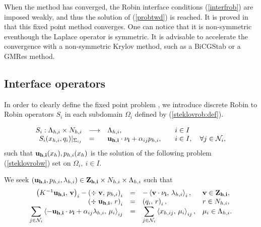 When the method has converged, the Robin interface conditions (\ref{interfrob})
are imposed weakly, and thus the solution of (\ref{probtwd}) is reached. It is
proved in \cite{vfcement-1999} that this fixed point method converges. One can
notice that it is non-symmetric eventhough the Laplace operator is symmetric.
It is advisable to accelerate the convergence with a non-symmetric Krylov
method, such as a BiCGStab or a GMRes method.

\subsection{Interface operators}

In order to clearly define the fixed point problem%
, we introduce
discrete Robin to Robin operators ${S}_i$ in each subdomain $\Omega_i$ defined
by (\ref{steklovrob:def}).

\begin{equation}\label{steklovrob:def}\begin{array}{rlll}
{S}_i : \Lambda_{h,i} \times N_{h,i} & \longrightarrow & \Lambda_{h,i}, &\quad i \in I \\
{S}_i(x_{h,i} , q_i )|_{\Sigma_{ij}}  & = & 
{\bf u_{h,i} \cdot  \nu_i} + \alpha_{ij} p_{h,i},  &\quad i \in I, 
\quad \forall j \in {\mathcal N}_{i},
\end{array}\end{equation}
such that ${\bf u_{h,i}}(x_h), p_{h,i}(x_h)$ is the solution of the following problem
(\ref{steklovrobw}) set on $\Omega_i, \ i \in I$.

We seek $({\bf u_{h,i}}, p_{h,i}, \lambda_{h,i}) \in {\bf Z_{h,i}} \times
N_{h,i} \times \Lambda_{h,i}$ such that
\begin{equation}\label{steklovrobw}\begin{array}{rcll}
\left( K^{-1}{\bf u_{h,i}},\, {\bf v} \right)_{i} - 
\left( \div\; {\bf v}, \, p_{h,i} \right)_{i}  & = & \displaystyle 
- \left< {\bf v \cdot  \nu_i} , \, \lambda_{h,i} \right>_{i}, 
& {\bf v} \in {\bf Z_{h,i}}, \\
\left( \div\; {\bf u_{h,i}}, \, r \right)_{i} &= &
 \left(q_i, \, r \right)_{i},  & r \in N_{h,i},\\
\displaystyle \sum_{j \in {\mathcal N}_{i}} \left< - {\bf u_{h,i} \cdot  \nu_i}  
+ \alpha_{ij} \lambda_{h,i}  , 
\, \mu_{i} \right>_{ij} & = & 
\displaystyle \sum_{j \in {\mathcal N}_{i}} \left< x_{h,ij}  , 
\, \mu_{i} \right>_{ij},  & \mu_{i} \in \Lambda_{h,i}.\\
\end{array}\end{equation}


